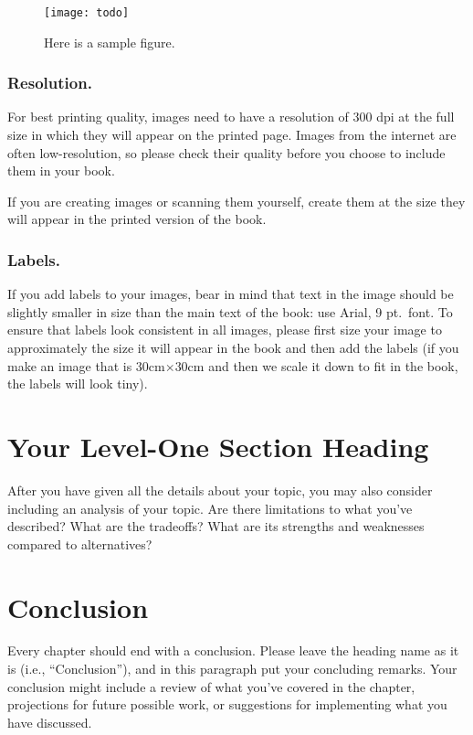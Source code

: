 \begin{figure}[htb]\centering
\texttt{[image: todo]}
\caption{Here is a sample figure.}
\label{YourName:fig2}
\end{figure}

\subsubsection{Resolution.}
For best printing quality, images need to have a resolution of 300 dpi at the full size in which they will appear on the printed page. Images from the internet are often low-resolution, so please check their quality before you choose to include them in your book.

If you are creating images or scanning them yourself, create them at the size they will appear in the printed version of the book.

\subsubsection{Labels.}
If you add labels to your images, bear in mind that text in the image should be slightly smaller in size than the main text of the book: use Arial, 9 pt.\ font. To ensure that labels look consistent in all images, please first size your image to approximately the size it will appear in the book and then add the labels (if you make an image that is 30cm$\times$30cm and then we scale it down to fit in the book, the labels will look tiny).

\section{Your Level-One Section Heading}

After you have given all the details about your topic, you may also consider including an analysis of your topic.
Are there limitations to what you've described? What are the tradeoffs? What are its strengths and weaknesses compared to alternatives?

\section{Conclusion}

Every chapter should end with a conclusion. Please leave the heading name as it is (i.e., ``Conclusion''), and in this paragraph put your concluding remarks. Your conclusion might include a review of what you've covered in the chapter, projections for future possible work, or suggestions for implementing what you have discussed.

